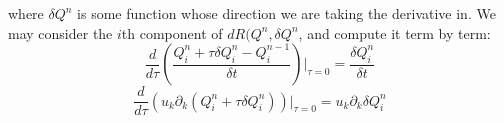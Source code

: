 \documentclass[reqno]{article}
\begin{document}
  where $\delta Q^n$ is some function whose direction we are taking the
  derivative in.
  We may consider the $i$th component of $dR(Q^n, \delta Q^n$, and compute
  it term by term:
  \begin{equation}
    \frac{d}{d\tau} \left(
      \frac{Q^n_i + \tau \delta Q^n_i - Q^{n - 1}_i}{\delta t}
    \right) \biggl|_{\tau = 0}
    =
    \frac{\delta Q^n_i}{\delta t}
  \end{equation}
  \begin{equation}
    \frac{d}{d\tau} \left(
      u_k \partial_k (Q^n_i + \tau \delta Q^n_i)
    \right) \biggr|_{\tau = 0}
    =
    u_k \partial_k \delta Q^n_i
  \end{equation}
  
	
\end{document}
